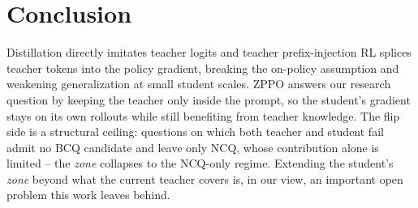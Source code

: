 \section{Conclusion}
\label{sec:conclusion}

Distillation directly imitates teacher logits and teacher prefix-injection RL splices teacher tokens into the policy gradient, breaking the on-policy assumption and weakening generalization at small student scales. ZPPO answers our research question by keeping the teacher only inside the prompt, so the student's gradient stays on its own rollouts while still benefiting from teacher knowledge. The flip side is a structural ceiling: questions on which both teacher and student fail admit no BCQ candidate and leave only NCQ, whose contribution alone is limited -- the \emph{zone} collapses to the NCQ-only regime. Extending the student's \emph{zone} beyond what the current teacher covers is, in our view, an important open problem this work leaves behind.

